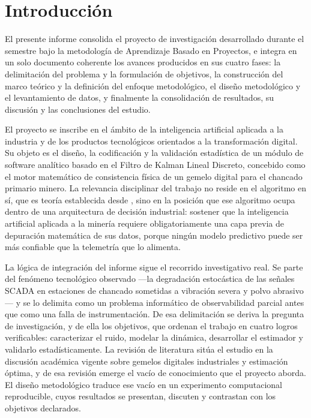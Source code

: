 \section{Introducción}
\label{sec:introduccion}

El presente informe consolida el proyecto de investigación desarrollado durante
el semestre bajo la metodología de Aprendizaje Basado en Proyectos, e integra en
un solo documento coherente los avances producidos en sus cuatro fases: la
delimitación del problema y la formulación de objetivos, la construcción del
marco teórico y la definición del enfoque metodológico, el diseño metodológico y
el levantamiento de datos, y finalmente la consolidación de resultados, su
discusión y las conclusiones del estudio.

El proyecto se inscribe en el ámbito de la inteligencia artificial aplicada a la
industria y de los productos tecnológicos orientados a la transformación
digital. Su objeto es el diseño, la codificación y la validación estadística de
un módulo de software analítico basado en el Filtro de Kalman Lineal Discreto,
concebido como el motor matemático de consistencia física de un gemelo digital
para el chancado primario minero. La relevancia disciplinar del trabajo no
reside en el algoritmo en sí, que es teoría establecida desde
\textcite{kalman1960}, sino en la posición que ese algoritmo ocupa dentro de una
arquitectura de decisión industrial: sostener que la inteligencia artificial
aplicada a la minería requiere obligatoriamente una capa previa de depuración
matemática de sus datos, porque ningún modelo predictivo puede ser más confiable
que la telemetría que lo alimenta.

La lógica de integración del informe sigue el recorrido investigativo real. Se
parte del fenómeno tecnológico observado —la degradación estocástica de las
señales SCADA en estaciones de chancado sometidas a vibración severa y polvo
abrasivo— y se lo delimita como un problema informático de observabilidad
parcial antes que como una falla de instrumentación. De esa delimitación se
deriva la pregunta de investigación, y de ella los objetivos, que ordenan el
trabajo en cuatro logros verificables: caracterizar el ruido, modelar la
dinámica, desarrollar el estimador y validarlo estadísticamente. La revisión de
literatura sitúa el estudio en la discusión académica vigente sobre gemelos
digitales industriales y estimación óptima, y de esa revisión emerge el vacío de
conocimiento que el proyecto aborda. El diseño metodológico traduce ese vacío en
un experimento computacional reproducible, cuyos resultados se presentan,
discuten y contrastan con los objetivos declarados.

